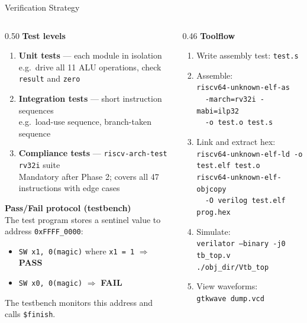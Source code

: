 \documentclass[aspectratio=169,10pt]{beamer}
\begin{document}
\begin{frame}{Verification Strategy}
  \begin{columns}[T]
    \begin{column}{0.50\textwidth}
      \textbf{Test levels}
      \begin{enumerate}
        \item \textbf{Unit tests} --- each module in isolation\\
          e.g.\ drive all 11 ALU operations, check \texttt{result} and \texttt{zero}
        \item \textbf{Integration tests} --- short instruction sequences\\
          e.g.\ load-use sequence, branch-taken sequence
        \item \textbf{Compliance tests} --- \texttt{riscv-arch-test rv32i} suite\\
          Mandatory after Phase 2; covers all 47 instructions with edge cases
      \end{enumerate}

      \vspace{0.6em}
      \textbf{Pass/Fail protocol (testbench)}\\
      The test program stores a sentinel value to address \texttt{0xFFFF\_0000}:
      \begin{itemize}\small
        \item \texttt{SW x1, 0(magic)} where \texttt{x1 = 1} $\Rightarrow$ \textbf{PASS}
        \item \texttt{SW x0, 0(magic)} $\Rightarrow$ \textbf{FAIL}
      \end{itemize}
      The testbench monitors this address and calls \texttt{\$finish}.
    \end{column}
    \begin{column}{0.46\textwidth}
      \textbf{Toolflow}
      \begin{enumerate}\small
        \item Write assembly test: \texttt{test.s}
        \item Assemble:\\
          \texttt{riscv64-unknown-elf-as}\\
          \texttt{\ \ -march=rv32i -mabi=ilp32}\\
          \texttt{\ \ -o test.o test.s}
        \item Link and extract hex:\\
          \texttt{riscv64-unknown-elf-ld -o test.elf test.o}\\
          \texttt{riscv64-unknown-elf-objcopy}\\
          \texttt{\ \ -O verilog test.elf prog.hex}
        \item Simulate:\\
          \texttt{verilator --binary -j0 tb\_top.v}\\
          \texttt{./obj\_dir/Vtb\_top}
        \item View waveforms:\\
          \texttt{gtkwave dump.vcd}
      \end{enumerate}


\end{column}
\end{columns}
\end{frame}
\end{document}
